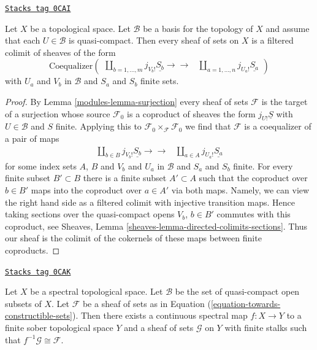 \begin{lemma}
\label{modules-lemma-filtered-colimit-constructibles}
\href{https://stacks.math.columbia.edu/tag/0CAI}{\texttt{Stacks tag 0CAI}}

Let $X$ be a topological space. Let $\mathcal{B}$ be a basis for the
topology of $X$ and assume that each $U \in \mathcal{B}$ is quasi-compact.
Then every sheaf of sets on $X$ is a filtered colimit of sheaves of the form
\begin{equation}
\label{equation-towards-constructible-sets}
\text{Coequalizer}\left(
\begin{array}{cc}\coprod\nolimits_{b = 1, \ldots, m} j_{V_b!}\underline{S_b}
\longrightarrow\longrightarrow & \coprod\nolimits_{a = 1, \ldots, n} j_{U_a!}\underline{S_a}\end{array}
\right)
\end{equation}
with $U_a$ and $V_b$ in $\mathcal{B}$ and $S_a$ and $S_b$ finite sets.
\end{lemma}

\begin{proof}

By Lemma \ref{modules-lemma-surjection} every sheaf of sets $\mathcal{F}$
is the target of a surjection whose source $\mathcal{F}_0$ is a coproduct
of sheaves the form $j_{U!}\underline{S}$ with $U \in \mathcal{B}$
and $S$ finite. Applying this to
$\mathcal{F}_0 \times_\mathcal{F} \mathcal{F}_0$
we find that $\mathcal{F}$ is a coequalizer of a pair of maps
$$
\begin{array}{cc}\coprod\nolimits_{b \in B} j_{V_b!}\underline{S_b}
\longrightarrow\longrightarrow & \coprod\nolimits_{a \in A} j_{U_a!}\underline{S_a}\end{array}
$$
for some index sets $A$, $B$ and $V_b$ and $U_a$ in $\mathcal{B}$ and
$S_a$ and $S_b$ finite. For every finite subset $B' \subset B$
there is a finite subset $A' \subset A$ such that the coproduct
over $b \in B'$ maps into the coproduct over $a \in A'$ via both maps.
Namely, we can view the right hand side as a filtered colimit with
injective transition maps. Hence taking sections over the quasi-compact
opens $V_b$, $b \in B'$ commutes with this coproduct,
see Sheaves, Lemma \ref{sheaves-lemma-directed-colimits-sections}.
Thus our sheaf is the colimit of the cokernels of these maps
between finite coproducts.
\end{proof}

\begin{lemma}
\label{modules-lemma-constructible-comes-from-finite}
\href{https://stacks.math.columbia.edu/tag/0CAK}{\texttt{Stacks tag 0CAK}}

Let $X$ be a spectral topological space. Let $\mathcal{B}$ be
the set of quasi-compact open subsets of $X$.
Let $\mathcal{F}$ be a sheaf of sets as in
Equation (\ref{equation-towards-constructible-sets}).
Then there exists a continuous spectral map $f : X \to Y$
to a finite sober topological space $Y$ and a sheaf
of sets $\mathcal{G}$ on $Y$ with finite stalks
such that $f^{-1}\mathcal{G} \cong \mathcal{F}$.
\end{lemma}

